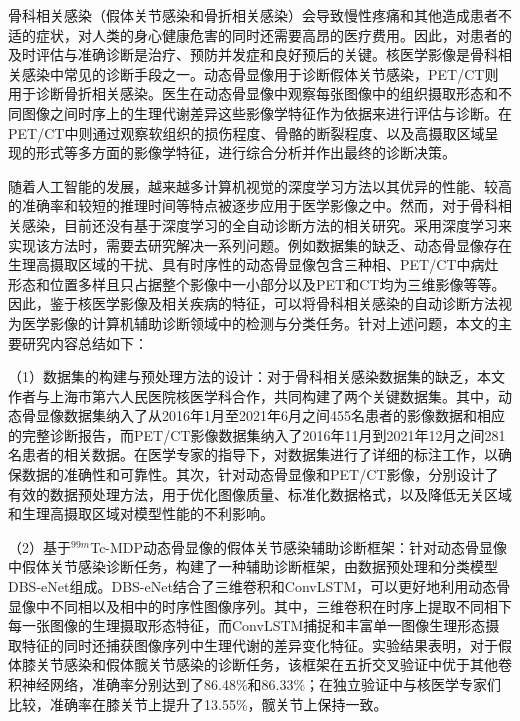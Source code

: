 \begin{cabstract}

    骨科相关感染（假体关节感染和骨折相关感染）会导致慢性疼痛和其他造成患者不适的症状，对人类的身心健康危害的同时还需要高昂的医疗费用。因此，对患者的及时评估与准确诊断是治疗、预防并发症和良好预后的关键。核医学影像是骨科相关感染中常见的诊断手段之一。动态骨显像用于诊断假体关节感染，PET/CT则用于诊断骨折相关感染。医生在动态骨显像中观察每张图像中的组织摄取形态和不同图像之间时序上的生理代谢差异这些影像学特征作为依据来进行评估与诊断。在PET/CT中则通过观察软组织的损伤程度、骨骼的断裂程度、以及高摄取区域呈现的形式等多方面的影像学特征，进行综合分析并作出最终的诊断决策。

    随着人工智能的发展，越来越多计算机视觉的深度学习方法以其优异的性能、较高的准确率和较短的推理时间等特点被逐步应用于医学影像之中。然而，对于骨科相关感染，目前还没有基于深度学习的全自动诊断方法的相关研究。采用深度学习来实现该方法时，需要去研究解决一系列问题。例如数据集的缺乏、动态骨显像存在生理高摄取区域的干扰、具有时序性的动态骨显像包含三种相、PET/CT中病灶形态和位置多样且只占据整个影像中一小部分以及PET和CT均为三维影像等等。因此，鉴于核医学影像及相关疾病的特征，可以将骨科相关感染的自动诊断方法视为医学影像的计算机辅助诊断领域中的检测与分类任务。针对上述问题，本文的主要研究内容总结如下：

    （1）数据集的构建与预处理方法的设计：对于骨科相关感染数据集的缺乏，本文作者与上海市第六人民医院核医学科合作，共同构建了两个关键数据集。其中，动态骨显像数据集纳入了从2016年1月至2021年6月之间455名患者的影像数据和相应的完整诊断报告，而PET/CT影像数据集纳入了2016年11月到2021年12月之间281名患者的相关数据。在医学专家的指导下，对数据集进行了详细的标注工作，以确保数据的准确性和可靠性。其次，针对动态骨显像和PET/CT影像，分别设计了有效的数据预处理方法，用于优化图像质量、标准化数据格式，以及降低无关区域和生理高摄取区域对模型性能的不利影响。

    （2）基于\(^{99m}\)Tc-MDP动态骨显像的假体关节感染辅助诊断框架：针对动态骨显像中假体关节感染诊断任务，构建了一种辅助诊断框架，由数据预处理和分类模型DBS-eNet组成。DBS-eNet结合了三维卷积和ConvLSTM，可以更好地利用动态骨显像中不同相以及相中的时序性图像序列。其中，三维卷积在时序上提取不同相下每一张图像的生理摄取形态特征，而ConvLSTM捕捉和丰富单一图像生理形态摄取特征的同时还捕获图像序列中生理代谢的差异变化特征。实验结果表明，对于假体膝关节感染和假体髋关节感染的诊断任务，该框架在五折交叉验证中优于其他卷积神经网络，准确率分别达到了86.48\%和86.33\%；在独立验证中与核医学专家们比较，准确率在膝关节上提升了13.55\%，髋关节上保持一致。


\end{cabstract}
